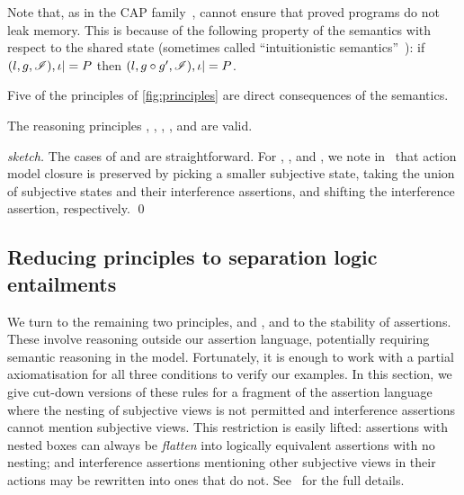 Note that, as in the CAP family~\cite{cap-ecoop10,icap,tada}, \colosl
cannot ensure that proved programs do not leak memory. This is because
of the following property of the semantics with respect to the shared
state (sometimes called ``intuitionistic semantics''~\cite{rey02}): if
$(l,g,\mathscr{I}), \iota |= P$ then $(l,g\circ g',\mathscr{I}), \iota |= P$.


Five of the principles of \fig\ref{fig:principles} are direct
consequences of the semantics.

\begin{lemma}
  \label{lem:assertion-facts}
  The \colosl reasoning principles 
  \forgetRule, \mergeRule, \shiftRule, \weakenRule, and \copyRule are valid.
\end{lemma}
\begin{proof}[sketch]
  The cases of \weakenRule and \copyRule are straightforward. For
  \forgetRule, \mergeRule, and \shiftRule, we note
  in~\cite{colosl-tr14} that action model closure is preserved by
  picking a smaller subjective state, taking the union of subjective
  states and their interference assertions, and shifting the
  interference assertion, respectively.
  \qed
\end{proof}


\subsection{Reducing \colosl principles to separation logic entailments}
\label{subsec:prules}



We turn to the remaining two principles, \extendRule and \shiftRule,
and to the stability of assertions. These involve reasoning outside our
assertion language, potentially requiring semantic reasoning 
in the model. Fortunately, it is enough to work
with a partial 
axiomatisation  for all three conditions to verify
our examples. In this section, we give cut-down versions of these
rules for a fragment of the \colosl assertion language where the 
nesting of subjective views is not permitted   and  interference
assertions cannot mention subjective views. This restriction is easily
lifted:  
assertions with nested boxes can always be \emph{flatten} into logically equivalent assertions with
no nesting; and  interference assertions  mentioning  other
subjective views in their actions may be rewritten into ones
that do not.  See~\cite{colosl-tr14} for the full details.%

